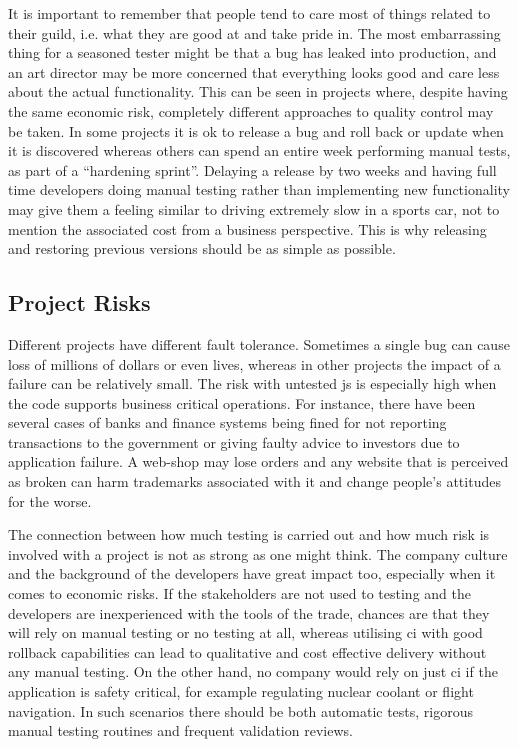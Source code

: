 \documentclass[11pt]{article}
\begin{document}
It is important to remember that people tend to care most of things related to their guild, i.e. what they are good at and take pride in. The most embarrassing thing for a seasoned tester might be that a bug has leaked into production, and an art director may be more concerned that everything looks good and care less about the actual functionality. This can be seen in projects where, despite having the same economic risk, completely different approaches to quality control may be taken. In some projects it is ok to release a bug and roll back or update when it is discovered whereas others can spend an entire week performing manual tests, as part of a ``hardening sprint''. Delaying a release by two weeks and having full time developers doing manual testing rather than implementing new functionality may give them a feeling similar to driving extremely slow in a sports car, not to mention the associated cost from a business perspective. This is why releasing and restoring previous versions should be as simple as possible. \cite[question~38]{Ahnve}

\subsection{Project Risks}
\label{subsec:projectrisks}

Different projects have different fault tolerance. Sometimes a single bug can cause loss of millions of dollars or even lives, whereas in other projects the impact of a failure can be relatively small. The risk with untested \gls{js} is especially high when the code supports business critical operations. For instance, there have been several cases of banks and finance systems being fined for not reporting transactions to the government \cite{Bug1} or giving faulty advice to investors \cite{Bug2} due to application failure. A web-shop may lose orders and any website that is perceived as broken can harm trademarks associated with it and change people's attitudes for the worse.

The connection between how much testing is carried out and how much risk is involved with a project is not as strong as one might think. The company culture and the background of the developers have great impact too, especially when it comes to economic risks. If the stakeholders are not used to testing and the developers are inexperienced with the tools of the trade, chances are that they will rely on manual testing or no testing at all, whereas utilising \gls{ci} with good rollback capabilities can lead to qualitative and cost effective delivery without any manual testing. On the other hand, no company would rely on just \gls{ci} if the application is safety critical, for example regulating nuclear coolant or flight navigation. In such scenarios there should be both automatic tests, rigorous manual testing routines and frequent validation reviews. \cite[questions~14,~38]{Ahnve}
\end{document}
